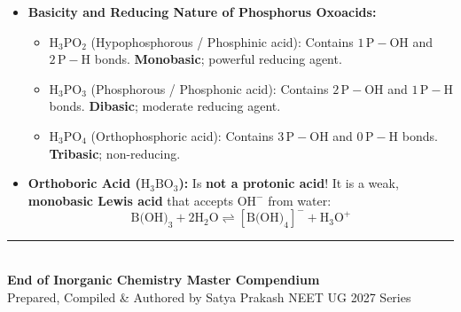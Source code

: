 \documentclass[11pt,a4paper]{article}
\begin{document}
\begin{trapbox}
\begin{itemize}
  \item \textbf{Basicity and Reducing Nature of Phosphorus Oxoacids:}
  \begin{itemize}
    \item $\text{H}_3\text{PO}_2$ (Hypophosphorous / Phosphinic acid): Contains $1\,\text{P}-\text{OH}$ and $2\,\text{P}-\text{H}$ bonds. \textbf{Monobasic}; powerful reducing agent.
    \item $\text{H}_3\text{PO}_3$ (Phosphorous / Phosphonic acid): Contains $2\,\text{P}-\text{OH}$ and $1\,\text{P}-\text{H}$ bonds. \textbf{Dibasic}; moderate reducing agent.
    \item $\text{H}_3\text{PO}_4$ (Orthophosphoric acid): Contains $3\,\text{P}-\text{OH}$ and $0\,\text{P}-\text{H}$ bonds. \textbf{Tribasic}; non-reducing.
  \end{itemize}
  \item \textbf{Orthoboric Acid ($\text{H}_3\text{BO}_3$):} Is \textbf{not a protonic acid}! It is a weak, \textbf{monobasic Lewis acid} that accepts $\text{OH}^-$ from water:
  \begin{equation*}
    \text{B(OH)}_3 + 2\text{H}_2\text{O} \rightleftharpoons [\text{B(OH)}_4]^- + \text{H}_3\text{O}^+
  \end{equation*}
\end{itemize}
\end{trapbox}

\vspace{15pt}
\begin{center}
  \rule{0.6\textwidth}{0.8pt}\\[6pt]
  {\small\textbf{\color{primarydark}End of Inorganic Chemistry Master Compendium}}\\[2pt]
  {\footnotesize\color{accentblue}Prepared, Compiled \& Authored by Satya Prakash \quad\textbar\quad NEET UG 2027 Series}
\end{center}
\end{document}
